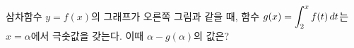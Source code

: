 \noindent\begin{minipage}[t]{0.58\linewidth}\vspace{0pt}\raggedright 삼차함수 $y=f(x)$의 그래프가 오른쪽 그림과 같을 때, 함수 $g(x)=\displaystyle\int_{2}^{x} f(t)\mkern3mu dt$는 $x=\alpha$에서 극솟값을 갖는다. 이때 $\alpha-g(\alpha)$의 값은?\end{minipage}\hfill\begin{minipage}[t]{0.4\linewidth}\vspace{0pt}\centering \resizebox{\ifdim\width>\linewidth\linewidth\else\width\fi}{!}{}\end{minipage}\par
{}
